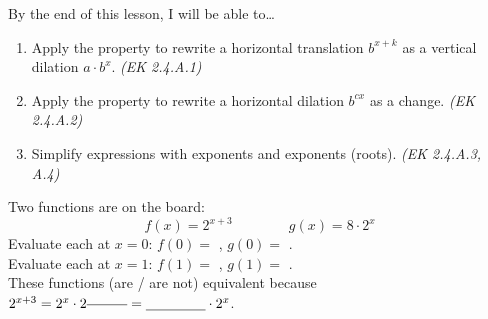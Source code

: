 \documentclass[10pt]{article}
\begin{document}
\namedateperiod

\vspace{0.08in}

\begin{objectivebox}
By the end of this lesson, I will be able to\ldots
\begin{enumerate}[itemsep=2pt]
  \item Apply the \blank{3.5cm} property to rewrite a horizontal translation $b^{x+k}$ as a
        vertical dilation $a \cdot b^x$. \hfill\textit{(EK 2.4.A.1)}
  \item Apply the \blank{3cm} property to rewrite a horizontal dilation $b^{cx}$ as a
        \blank{3cm} change. \hfill\textit{(EK 2.4.A.2)}
  \item Simplify expressions with \blank{3cm} exponents and \blank{3cm} exponents
        (roots). \hfill\textit{(EK 2.4.A.3, A.4)}
\end{enumerate}
\end{objectivebox}

\vspace{0.06in}

\begin{vocabbox}
\end{vocabbox}

\vspace{0.06in}

\begin{hookbox}
Two functions are on the board:
\[
  f(x) = 2^{x+3} \qquad\qquad g(x) = 8 \cdot 2^x
\]
Evaluate each at $x = 0$: $f(0) = $ \blank{2cm}, $g(0) = $ \blank{2cm}. \\[4pt]
Evaluate each at $x = 1$: $f(1) = $ \blank{2cm}, $g(1) = $ \blank{2cm}. \\[4pt]
These functions \blank{3cm} (are / are not) equivalent because $2^{x+3} = 2^x \cdot 2^{\blank{1cm}} = \blank{1.5cm} \cdot 2^x$.
\end{hookbox}

\vspace{0.06in}
\end{document}
